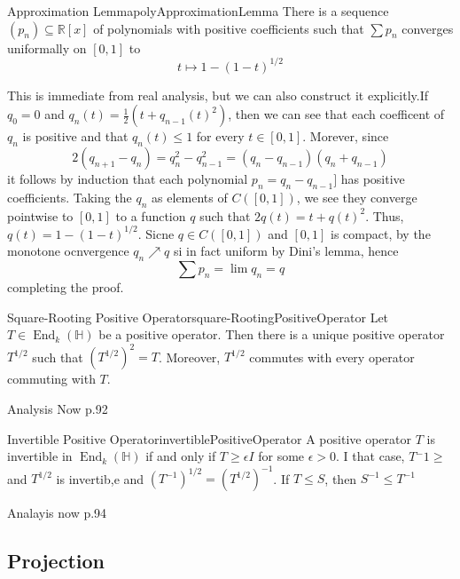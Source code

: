 \documentclass[oneside]{book}
\newcommand{\R}{\mathbb{R}}
\renewcommand{\H}{\mathbb{H}}
\newcommand{\sse}{\subseteq}
\newcommand{\End}{\operatorname{End}}
\begin{document}
\begin{lem}{Approximation Lemma}{polyApproximationLemma}
	There is a sequence $(p_n)\sse \R[x]$ of polynomials with positive coefficients such that $\sum p_n$
	converges uniformally on $[0,1]$ to
	\[
		t \mapsto 1 - (1-t)^{1/2}
	\]
\end{lem}

\begin{Proof}
	This is immediate from real analysis, but we can also construct it explicitly.If $q_0 = 0$ and $q_n(t)
	= \frac{1}{2}(t + q_{n-1}(t)^2)$, then we can see that each coefficent of $q_n$ is positive and that $q_n(t)
	\le 1$ for every $t \in [0,1]$. Morever, since
	\[
		2(q_{n+1} - q_n) = q_n^2 - q_{n-1}^2 = (q_n - q_{n-1})(q_n + q_{n-1})
	\]
	it follows by induction that each polynomial $p_n = q_n - q_{n-1}]$ has positive coefficients. Taking the
	$q_n$ as elements of $C([0,1])$, we see they converge pointwise to $[0,1]$ to a function $q$ such that
	$2q(t) = t + q(t)^2$. Thus, $q(t) = 1 - (1-t)^{1/2}$. Sicne $q \in C([0,1])$ and $[0,1]$ is compact, by the
	monotone ocnvergence $q_n \nearrow q$ si in fact uniform by Dini's lemma, hence
	\[
		\sum p_n = \lim q_n = q
	\]
	completing the proof.
\end{Proof}

\begin{prop}{Square-Rooting Positive Operator}{square-RootingPositiveOperator}
	Let $T \in \End_k(\H)$ be a positive operator. Then there is a unique positive operator $T^{1/2}$ such that
	$(T^{1/2})^2 = T$. Moreover, $T^{1/2}$ commutes with every operator commuting with $T$.
\end{prop}

\begin{Proof}
	Analysis Now p.92
\end{Proof}

\begin{prop}{Invertible Positive Operator}{invertiblePositiveOperator}
	A positive operator $T$ is invertible in $\End_k(\H)$ if and only if $T \ge \epsilon I$ for some $\epsilon > 0$.
	I that case, $T{^-1} \ge $ and $T^{1/2}$ is invertib,e and $(T^{-1})^{1/2} = ( T^{ 1/2 })^{-1}$. If $T \le S$,
	then $S^{-1} \le T^{-1}$
\end{prop}

\begin{Proof}
	Analayis now p.94
\end{Proof}

\subsection*{Projection}
\end{document}
